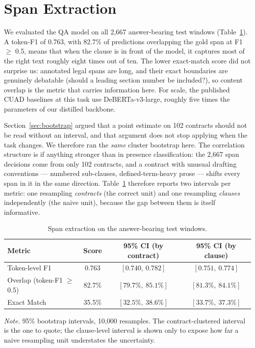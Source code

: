 \section{Span Extraction}
\label{sec:span}
We evaluated the QA model on all 2{,}667 answer-bearing test windows (Table~\ref{tab:span}). A token-F1 of 0.763, with 82.7\% of predictions overlapping the gold span at F1 $\geq$ 0.5, means that when the clause is in front of the model, it captures most of the right text roughly eight times out of ten. The lower exact-match score did not surprise us: annotated legal spans are long, and their exact boundaries are genuinely debatable (should a leading section number be included?), so content overlap is the metric that carries information here. For scale, the published CUAD baselines at this task use DeBERTa-v3-large, roughly five times the parameters of our distilled backbone.

Section~\ref{sec:bootstrap} argued that a point estimate on 102 contracts should not be read without an interval, and that argument does not stop applying when the task changes. We therefore ran the \emph{same} cluster bootstrap here. The correlation structure is if anything stronger than in presence classification: the 2{,}667 span decisions come from only 102 contracts, and a contract with unusual drafting conventions --- numbered sub-clauses, defined-term-heavy prose --- shifts every span in it in the same direction. Table~\ref{tab:span} therefore reports two intervals per metric: one resampling \emph{contracts} (the correct unit) and one resampling \emph{clauses} independently (the naive unit), because the gap between them is itself informative.

\begin{table}[ht]
\centering
\caption{Span extraction on the answer-bearing test windows.}
\label{tab:span}
\small
\begin{tabular}{lccc}
\toprule
\textbf{Metric} & \textbf{Score} & \textbf{95\% CI (by contract)} & \textbf{95\% CI (by clause)}\\
\midrule
Token-level F1                & 0.763 & $[0.740,\ 0.782]$ & $[0.751,\ 0.774]$\\
Overlap (token-F1 $\geq$ 0.5) & 82.7\% & $[79.7\%,\ 85.1\%]$ & $[81.3\%,\ 84.1\%]$\\
Exact Match                   & 35.5\% & $[32.5\%,\ 38.6\%]$ & $[33.7\%,\ 37.3\%]$\\
\bottomrule
\end{tabular}

{\footnotesize\singlespacing \emph{Note.} 95\% bootstrap intervals, 10{,}000 resamples. The contract-clustered interval is the one to quote; the clause-level interval is shown only to expose how far a naive resampling unit understates the uncertainty.\par}
\end{table}

